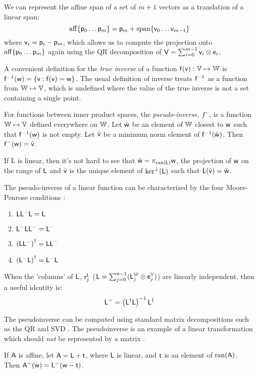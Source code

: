 We can represent the affine span of a set of $m+1$ vectors
as a translation of a linear span:
\begin{equation}
\mathrm{aff}\{ \mathsf{p}_0 \ldots \mathsf{p}_{m} \} = \mathsf{p}_m + \mathrm{span}\{\mathsf{v}_0 \ldots \mathsf{v}_{m-1}\}
\end{equation}
where $\mathsf{v}_i = \mathsf{p}_i - \mathsf{p}_m$,
which allows us to compute the projection onto
$\mathrm{aff}\{ \mathsf{p}_0 \ldots \mathsf{p}_{m} \}$
again using the QR decomposition
of $\mathsf{V} = \sum_{i=0}^{m-1} \mathsf{v}_i \otimes \mathsf{e}_i$.

\label{sec:Linear-inverses-and-pseudo-inverses}

A convenient definition for the \textit{true inverse}
of a function $\mathsf{f}(\mathsf{v}):\mathbb{V} \mapsto \mathbb{W}$ is
$\mathsf{f}^{-1}(\mathsf{w}) = \{ \mathsf{v} : \mathsf{f}(\mathsf{v}) = \mathsf{w} \}$.
The usual definition of inverse treats $\mathsf{f}^{-1}$
as a function from $\mathbb{W} \mapsto \mathbb{V}$,
which is undefined where the value of the true
inverse is not a set containing a single point.

For functions between inner product spaces,
the \textit{pseudo-inverse}, $f^{-}$, is a function $\mathbb{W} \mapsto \mathbb{V}$
defined everywhere on $\mathbb{W}$.
Let $\hat{\mathsf{w}}$ be an element of $\mathbb{W}$ closest to $\mathsf{w}$
such that $\mathsf{f}^{-1}(\mathsf{w})$ is not empty.
Let $\hat{\mathsf{v}}$ be a minimum norm element of $\mathsf{f}^{-1}(\hat{\mathsf{w}})$.
Then $\mathsf{f}^{-}(\mathsf{w}) = \hat{\mathsf{v}}$.

If $\mathsf{L}$ is linear, then it's not hard to see that
$\hat{\mathsf{w}} = \pi_{\mathrm{ran}(\mathsf{L})} \mathsf{w}$, the projection of $\mathsf{w}$
on the range of $\mathsf{L}$
and
$\hat{\mathsf{v}}$ is the unique element of $\mathrm{ker}^{\perp}(\mathsf{L})$
such that $\mathsf{L}(\hat{\mathsf{v}}) = \hat{\mathsf{w}}$.

The pseudo-inverse of a linear function can be characterized
by the four Moore-Penrose conditions
\cite[See][sec. 5.5.2]{golub-vanloan-2012}:
\begin{enumerate}
\item $\mathsf{L} \mathsf{L}^{-} \mathsf{L} = \mathsf{L}$
\item $\mathsf{L}^{-} \mathsf{L} \mathsf{L}^{-} = \mathsf{L}^{-}$
\item $\left( \mathsf{L} \mathsf{L}^{-} \right)^{\dagger} = \mathsf{L} \mathsf{L}^{-}$
\item $\left( \mathsf{L}^{-} \mathsf{L} \right)^{\dagger} = \mathsf{L}^{-} \mathsf{L}$
\end{enumerate}

When the 'columns' of $\mathsf{L}$, $\mathsf{r}_j^{\mathsf{L}}$
($\mathsf{L} = \sum_{j=0}^{n-1} ( \mathsf{L}_j^{\mathbb{W}} \otimes \mathsf{e}_j^{\mathbb{V}} )$)
are linearly independent,
then a useful identity is:
\begin{equation}
\label{eq:full-rank-pseudo-inverse}
\mathsf{L}^{-} = \left( \mathsf{L}^{\dagger} \mathsf{L} \right)^{-1} \mathsf{L}^{\dagger}
\end{equation}

The pseudoinverse can be computed
using standard matrix decompositions such as
the QR and SVD \cite{golub-vanloan-2012}.
The pseudoinverse is an example of a linear transformation
which should {\em not} be represented by a matrix
\cite{mcdonald-1989b}.

If $\mathsf{A}$ is affine,
let $\mathsf{A} = \mathsf{L} + \mathsf{t}$,
where $\mathsf{L}$ is linear,
and $\mathsf{t}$ is an element of $\mathrm{ran}(\mathsf{A})$.
Then $\mathsf{A}^{-}(\mathsf{w}) = \mathsf{L}^{-}( \mathsf{w} - \mathsf{t} )$.

